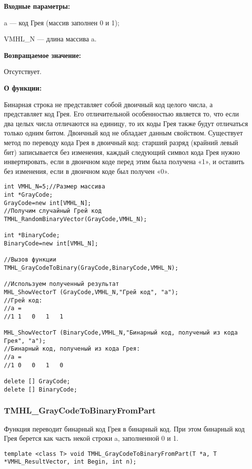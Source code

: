 \documentclass[a4paper,12pt]{article}
\begin{document}
\textbf{Входные параметры:}
 
 a --- код Грея (массив заполнен 0 и 1);
 
 VMHL\_N --- длина массива a.
 
\textbf{Возвращаемое значение:}

 Отсутствует.
 
\textbf{О функции:}

Бинарная строка не представляет собой двоичный код целого числа, а представляет код Грея. Его отличительной особенностью является то, что если два целых числа отличаются на единицу, то их коды Грея также будут отличаться только одним битом. Двоичный код не обладает данным свойством.
Существует метод по переводу кода Грея в двоичный код: старший разряд (крайний левый бит) записывается без изменения, каждый следующий символ кода Грея нужно инвертировать, если в двоичном коде перед этим была получена «1», и оставить без изменения, если в двоичном коде был получен «0». 


\begin{lstlisting}[label=code_use_TMHL_GrayCodeToBinary,caption=Пример использования]
int VMHL_N=5;//Размер массива
int *GrayCode;
GrayCode=new int[VMHL_N];
//Получим случайный Грей код
TMHL_RandomBinaryVector(GrayCode,VMHL_N);

int *BinaryCode;
BinaryCode=new int[VMHL_N];

//Вызов функции
TMHL_GrayCodeToBinary(GrayCode,BinaryCode,VMHL_N);

//Используем полученный результат
MHL_ShowVectorT (GrayCode,VMHL_N,"Грей код", "a");
//Грей код:
//a =
//1	1	0	1	1

MHL_ShowVectorT (BinaryCode,VMHL_N,"Бинарный код, полученый из кода Грея", "a");
//Бинарный код, полученый из кода Грея:
//a =
//1	0	0	1	0

delete [] GrayCode;
delete [] BinaryCode;
\end{lstlisting}

\subsubsection{TMHL\_GrayCodeToBinaryFromPart}\label{TMHL_GrayCodeToBinaryFromPart}

Функция переводит бинарный код Грея в бинарный код. При этом бинарный код Грея берется как часть некой строки a, заполненной 0 и 1.


\begin{lstlisting}[label=code_syntax_TMHL_GrayCodeToBinaryFromPart,caption=Синтаксис]
template <class T> void TMHL_GrayCodeToBinaryFromPart(T *a, T *VMHL_ResultVector, int Begin, int n);
\end{lstlisting}
\end{document}
